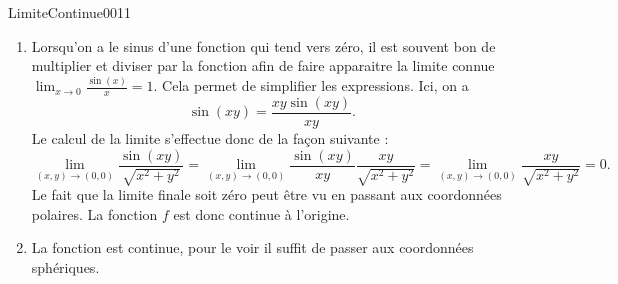 \begin{corrige}{LimiteContinue0011}

  \begin{enumerate}
  \item 

	  Lorsqu'on a le sinus d'une fonction qui tend vers zéro, il est souvent bon de multiplier et diviser par la fonction afin de faire apparaitre la limite connue $\lim_{x\to 0} \frac{ \sin(x) }{ x }=1$. Cela permet de simplifier les expressions. Ici, on a
	  \begin{equation}
		  \sin(xy)=\frac{ xy\sin(xy) }{ xy }.
	  \end{equation}
	  Le calcul de la limite s'effectue donc de la façon suivante :
    \begin{equation}
	    \lim_{(x,y)\to (0,0)}\frac{\sin(xy)}{\sqrt{x^2+y^2}}=\lim_{(x,y)\to (0,0)}\frac{\sin(xy)}{xy}\frac{xy}{\sqrt{x^2+y^2}}=\lim_{(x,y)\to(0,0)}\frac{ xy }{ \sqrt{x^2+y^2} }=0.
    \end{equation}
    Le fait que la limite finale soit zéro peut être vu en passant aux coordonnées polaires. La fonction $f$ est donc continue à l'origine.

	\item
		La fonction est continue, pour le voir il suffit de passer aux coordonnées sphériques.  
  \end{enumerate}
  

\end{corrige}
